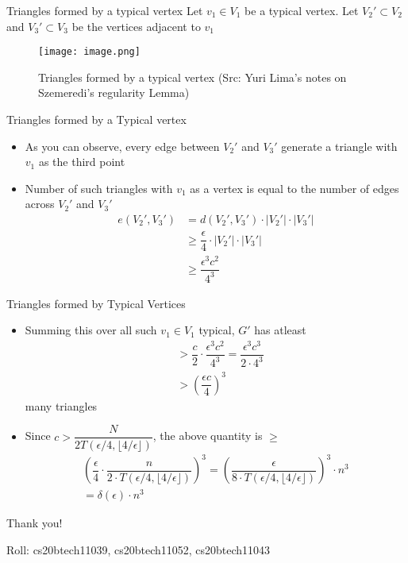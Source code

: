 \documentclass[10pt]{beamer}
\begin{document}
\begin{frame}{Triangles formed by a typical vertex}
Let $v_1 \in V_1$ be a typical vertex. Let $V_2' \subset V_2$ and $V_3' \subset V_3$ be the vertices adjacent to $v_1$
    \begin{figure}
        \centering
        \texttt{[image: image.png]}
        \caption{Triangles formed by a typical vertex (Src: Yuri Lima's notes on Szemeredi's regularity Lemma)}
        \label{fig:my_label}
    \end{figure}
\end{frame}
\begin{frame}{Triangles formed by a Typical vertex}
\begin{itemize}
    \item As you can observe, every edge between $V_2'$ and $V_3'$ generate a triangle with $v_1$ as the third point
    \item Number of such triangles with $v_1$ as a vertex is equal to the number of edges across $V_2'$ and $V_3'$ \begin{align}
       e(V_2', V_3') &= d(V_2', V_3') \cdot |V_2'| \cdot |V_3'| \\
        &\geq \dfrac{\epsilon}{4} \cdot |V_2'| \cdot |V_3'| \\
        &\geq \dfrac{\epsilon^3 c^2}{4^3}
    \end{align}
\end{itemize} 
\end{frame}

\begin{frame}{Triangles formed by Typical Vertices}
    \begin{itemize}
        \item Summing this over all such $v_1 \in V_1$ typical, $G'$ has atleast \begin{align}
            &>\dfrac{c}{2} \cdot \dfrac{\epsilon^3 c^2}{4^3} = \dfrac{\epsilon^3 c^3}{2 \cdot 4^3} \\
            &> (\dfrac{\epsilon c}{4})^3
        \end{align} many triangles
    \item Since $c > \dfrac{N}{2T(\epsilon/4, \lfloor 4/\epsilon \rfloor)}$, the above quantity is $\geq$ \begin{align}
        (\dfrac{\epsilon}{4} \cdot \dfrac{n}{2\cdot T(\epsilon/4, \lfloor 4/\epsilon \rfloor)})^3 = (\dfrac{\epsilon}{8\cdot T(\epsilon/4, \lfloor 4/\epsilon \rfloor)})^3\cdot n^3 \\
        =\delta(\epsilon)\cdot n^3
    \end{align}
    \end{itemize}
\end{frame}

\begin{frame}
\textcolor{myNewColorA}{\huge{\centerline{Thank you!}}}
\vspace*{0.5cm}

\textcolor{myNewColorA}{\Large{\centerline{Roll: cs20btech11039, cs20btech11052, cs20btech11043}}}

\end{frame}
\end{document}
